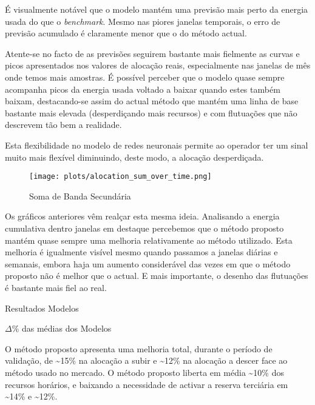 É visualmente notável que o modelo mantém uma previsão mais perto da energia usada do que o \textit{benchmark}. Mesmo nas piores janelas temporais, o erro de previsão acumulado é claramente menor que o do método actual.\par
Atente-se no facto de as previsões seguirem bastante mais fielmente as curvas e picos apresentados nos valores de alocação reais, especialmente nas janelas de mês onde temos mais amostras. É possível perceber que o modelo quase sempre acompanha picos da energia usada voltado a baixar quando estes também baixam, destacando-se assim do actual método que mantém uma linha de base bastante mais elevada (desperdiçando mais recursos) e com flutuações que não descrevem tão bem a realidade.\par
Esta flexibilidade no modelo de redes neuronais permite ao operador ter um sinal muito mais flexível diminuindo, deste modo, a alocação desperdiçada.\par

\begin{figure}[H]
    \centering
    \texttt{[image: plots/alocation\_sum\_over\_time.png]}
    \caption{Soma de Banda Secundária}
    \label{fig:mltimewindowssum}
\end{figure}

Os gráficos anteriores vêm realçar esta mesma ideia. Analisando a energia cumulativa dentro janelas em destaque percebemos que o método proposto mantém quase sempre uma melhoria relativamente ao método utilizado. Esta melhoria é igualmente visível mesmo quando passamos a janelas diárias e semanais, embora haja um aumento considerável das vezes em que o método proposto não é melhor que o actual. E mais importante, o desenho das flutuações é bastante mais fiel ao real.\par


\begin{table}[H]
    \centering
    \caption{Resultados Modelos}    
    \resizebox{0.8\linewidth}{!}{}
    \label{tab:mlres}
    \end{table}



\begin{table}[H]
    \caption{$\Delta$\% das médias dos Modelos}    
    \resizebox{\linewidth}{!}{}
    \label{tab:mlres_deltas}
    \end{table}

O método proposto apresenta uma melhoria total, durante o período de validação, de \textasciitilde15\% na alocação a subir e \textasciitilde12\% na alocação a descer face ao método usado no mercado. %
O método proposto liberta em média \textasciitilde10\% dos recursos horários, e baixando a necessidade de activar a reserva terciária em \textasciitilde14\% e \textasciitilde12\%.\par

